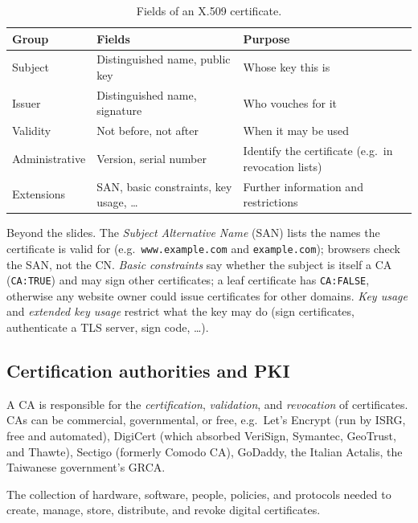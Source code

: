 \begin{table}[H]
\centering
\caption{Fields of an X.509 certificate.}
\label{tab:x509}
\begin{tabularx}{\textwidth}{@{}l l X@{}}
\toprule
Group & Fields & Purpose \\
\midrule
Subject & Distinguished name, public key & Whose key this is \\
Issuer & Distinguished name, signature & Who vouches for it \\
Validity & Not before, not after & When it may be used \\
Administrative & Version, serial number & Identify the certificate (e.g.\ in revocation lists) \\
Extensions & SAN, basic constraints, key usage, \dots & Further information and restrictions \\
\bottomrule
\end{tabularx}
\end{table}

\begin{remark}
Beyond the slides. The \emph{Subject Alternative Name} (SAN) lists the names the certificate is valid for (e.g.\ \texttt{www.example.com} and \texttt{example.com}); browsers check the SAN, not the CN. \emph{Basic constraints} say whether the subject is itself a CA (\texttt{CA:TRUE}) and may sign other certificates; a leaf certificate has \texttt{CA:FALSE}, otherwise any website owner could issue certificates for other domains. \emph{Key usage} and \emph{extended key usage} restrict what the key may do (sign certificates, authenticate a TLS server, sign code, \dots).
\end{remark}

\subsection{Certification authorities and PKI}

A CA is responsible for the \emph{certification}, \emph{validation}, and \emph{revocation} of certificates. CAs can be commercial, governmental, or free, e.g.\ Let's Encrypt (run by ISRG, free and automated), DigiCert (which absorbed VeriSign, Symantec, GeoTrust, and Thawte), Sectigo (formerly Comodo CA), GoDaddy, the Italian Actalis, the Taiwanese government's GRCA.

\begin{definition}
The collection of hardware, software, people, policies, and protocols needed to create, manage, store, distribute, and revoke digital certificates.
\end{definition}

